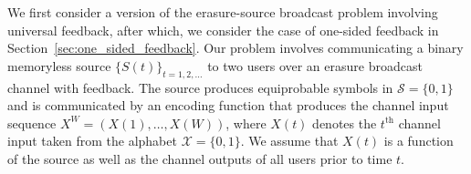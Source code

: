 We first consider a version of the erasure-source broadcast problem involving universal feedback, after which, we consider the case of one-sided feedback in Section~\ref{sec:one_sided_feedback}. Our problem involves communicating a binary memoryless source $\{S(t)\}_{t=1,2, \ldots}$ to two users over an erasure broadcast channel with feedback.  %
%
%
The source produces equiprobable symbols in $\mathcal{S}=\{0,1\}$ and is communicated by an encoding function that produces the channel input sequence $X^{W} = (X(1),  \dots , X(W))$, where $X(t)$ denotes the $t^{\mathrm{th}}$ channel input taken from the alphabet $\mathcal{X} = \{0, 1\}$.  We assume that 
$X(t)$ is a function of the source as well as the channel outputs of all users prior to time $t$.  


